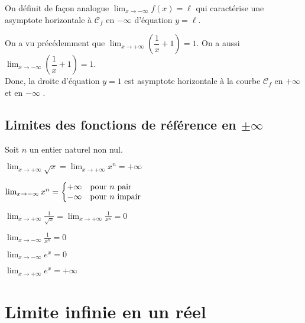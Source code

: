 \documentclass{cornouaille}
\begin{document}
  \begin{remarque}
  On définit de façon analogue $\lim_{x\to-\infty} f(x)=\ell$
  qui caractérise une asymptote horizontale à $\mathcal{C}_f$ en $-\infty$ d'équation $y=\ell$.
  \end{remarque}

  \begin{exemple}
On a vu précédemment que $\lim_{x\to+\infty}\left(\dfrac{1}{x}+1\right)=1$. On a aussi $\lim_{x\to-\infty}\left(\dfrac{1}{x}+1\right)=1$.\\
Donc, la droite d'équation $y=1$  est asymptote horizontale à la courbe $\mathcal{C}_f$  en $+\infty$ et en $-\infty$ .
  \end{exemple}

\subsection{Limites des fonctions de référence en $\pm\infty$}

\begin{propriete}
Soit $n$ un entier naturel non nul.
\begin{colitemize}{2}
\item $ \lim_{x\to+\infty}\sqrt{x}=\lim_{x\to+\infty}x^n=+\infty$
\item $ \lim_{x\to-\infty}x^n=\left\{\begin{array}{@{}ll}
+\infty &  \text{pour~} n \text{~pair} \\
-\infty &  \text{pour~} n \text{~impair}
\end{array}\right.$
\item $ \lim_{x\to+\infty}\frac{1}{\sqrt{x}}=\lim_{x\to+\infty}\frac{1}{x^n}=0$
\item $ \lim_{x\to-\infty}\frac{1}{x^n}=0$
\item $ \lim_{x\to-\infty} e^x=0$
\item $ \lim_{x\to+\infty} e^x=+\infty$
\end{colitemize}
\end{propriete}




\section{Limite infinie en un réel}
\end{document}
